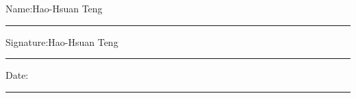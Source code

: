 \documentclass[11pt,oneside]{book}
\begin{document}
\noindent Name:Hao-Hsuan Teng\\[1mm]
\rule[1em]{25em}{0.5pt}

\noindent Signature:Hao-Hsuan Teng\\[1mm]
\rule[1em]{25em}{0.5pt}

\noindent Date:\\[1mm]
\rule[1em]{25em}{0.5pt}





\tableofcontents
\listoffigures


\mainmatter







 
 
\end{document}
